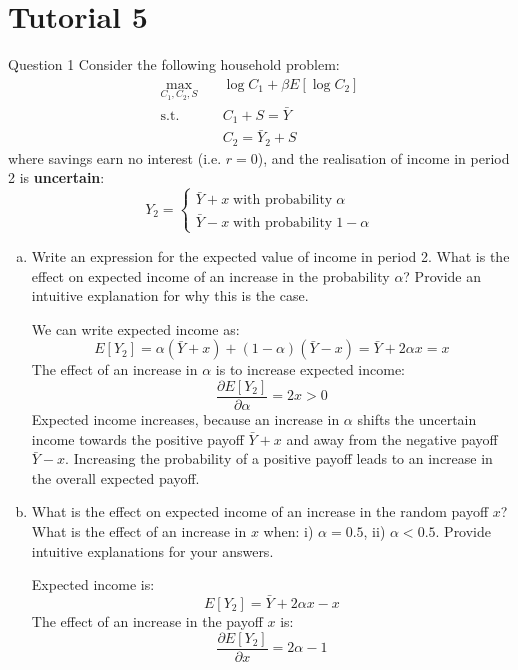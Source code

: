 \documentclass[a4paper]{article}
\begin{document}
\section{Tutorial 5}
	\begin{questionbox}{Question 1}
		Consider the following household problem:
		\begin{align*}
			\max_{C_1,C_2,S} \quad &\log C_1 + \beta E[\log C_2]\\
			\text{s.t.} \quad &C_1 + S =\bar{Y}\\
			&C_2 = \bar{Y}_2 + S
		\end{align*}
		where savings earn no interest (i.e. \( r = 0 \)), and the realisation of income in period 2 is \textbf{uncertain}:
		\[
			Y_2 =
			\begin{cases}
				\bar{Y} + x \;\text{with probability}\; \alpha\\
				\bar{Y} - x \;\text{with probability}\; 1 - \alpha
			\end{cases}
		\]
		\begin{enumerate}[(a)]
			\item Write an expression for the expected value of income in period 2. What is the eﬀect on expected income of an increase in the probability \( \alpha \)? Provide an intuitive explanation for why this is the case.
			\begin{explanationbox}
				We can write expected income as:
				\[
					E[Y_2] = \alpha(\bar{Y} + x) + (1 - \alpha)(\bar{Y} - x) = \bar{Y} + 2\alpha x = x
				\]
				The eﬀect of an increase in \( \alpha \) is to increase expected income:
				\[
					\frac{\partial E[Y_2]}{\partial \alpha} = 2x > 0
				\]
				Expected income increases, because an increase in \( \alpha \) shifts the uncertain income towards the positive payoff \( \bar{Y} + x \) and away from the negative payoﬀ \( \bar{Y} - x \). Increasing the probability of a positive payoﬀ leads to an increase in the overall expected payoﬀ.
			\end{explanationbox}
			\item What is the effect on expected income of an increase in the random payoﬀ \( x \)? What is the eﬀect of an increase in \( x \) when: i) \( \alpha = 0.5 \), ii) \( \alpha < 0.5 \). Provide intuitive explanations for your answers.
			\begin{explanationbox}
				Expected income is:
				\[
					E[Y_2] = \bar{Y} + 2\alpha x - x
				\]
				The eﬀect of an increase in the payoff \( x \) is:
				\[
					\frac{\partial E[Y_2]}{\partial x} = 2\alpha - 1
				\]
				\begin{enumerate}[(i)]

\end{enumerate}
\end{explanationbox}
\end{enumerate}
\end{questionbox}
\end{document}
